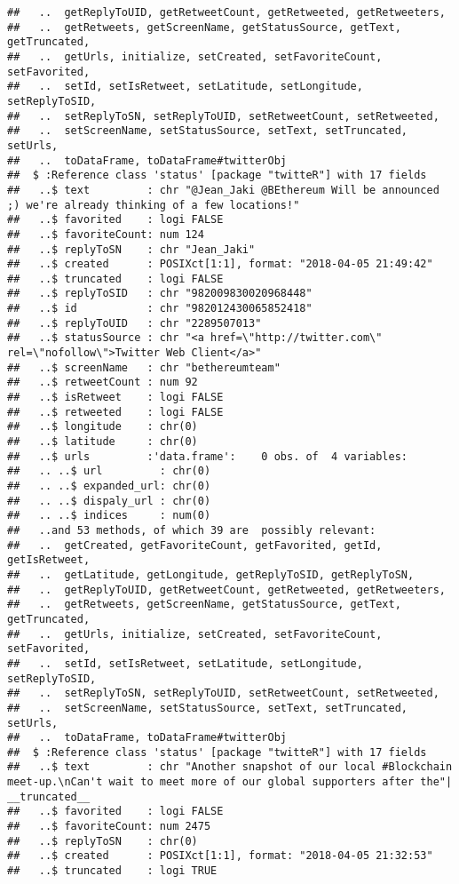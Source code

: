 \documentclass[]{article}
\begin{document}
\begin{verbatim}
##   ..  getReplyToUID, getRetweetCount, getRetweeted, getRetweeters,
##   ..  getRetweets, getScreenName, getStatusSource, getText, getTruncated,
##   ..  getUrls, initialize, setCreated, setFavoriteCount, setFavorited,
##   ..  setId, setIsRetweet, setLatitude, setLongitude, setReplyToSID,
##   ..  setReplyToSN, setReplyToUID, setRetweetCount, setRetweeted,
##   ..  setScreenName, setStatusSource, setText, setTruncated, setUrls,
##   ..  toDataFrame, toDataFrame#twitterObj
##  $ :Reference class 'status' [package "twitteR"] with 17 fields
##   ..$ text         : chr "@Jean_Jaki @BEthereum Will be announced ;) we're already thinking of a few locations!"
##   ..$ favorited    : logi FALSE
##   ..$ favoriteCount: num 124
##   ..$ replyToSN    : chr "Jean_Jaki"
##   ..$ created      : POSIXct[1:1], format: "2018-04-05 21:49:42"
##   ..$ truncated    : logi FALSE
##   ..$ replyToSID   : chr "982009830020968448"
##   ..$ id           : chr "982012430065852418"
##   ..$ replyToUID   : chr "2289507013"
##   ..$ statusSource : chr "<a href=\"http://twitter.com\" rel=\"nofollow\">Twitter Web Client</a>"
##   ..$ screenName   : chr "bethereumteam"
##   ..$ retweetCount : num 92
##   ..$ isRetweet    : logi FALSE
##   ..$ retweeted    : logi FALSE
##   ..$ longitude    : chr(0) 
##   ..$ latitude     : chr(0) 
##   ..$ urls         :'data.frame':    0 obs. of  4 variables:
##   .. ..$ url         : chr(0) 
##   .. ..$ expanded_url: chr(0) 
##   .. ..$ dispaly_url : chr(0) 
##   .. ..$ indices     : num(0) 
##   ..and 53 methods, of which 39 are  possibly relevant:
##   ..  getCreated, getFavoriteCount, getFavorited, getId, getIsRetweet,
##   ..  getLatitude, getLongitude, getReplyToSID, getReplyToSN,
##   ..  getReplyToUID, getRetweetCount, getRetweeted, getRetweeters,
##   ..  getRetweets, getScreenName, getStatusSource, getText, getTruncated,
##   ..  getUrls, initialize, setCreated, setFavoriteCount, setFavorited,
##   ..  setId, setIsRetweet, setLatitude, setLongitude, setReplyToSID,
##   ..  setReplyToSN, setReplyToUID, setRetweetCount, setRetweeted,
##   ..  setScreenName, setStatusSource, setText, setTruncated, setUrls,
##   ..  toDataFrame, toDataFrame#twitterObj
##  $ :Reference class 'status' [package "twitteR"] with 17 fields
##   ..$ text         : chr "Another snapshot of our local #Blockchain meet-up.\nCan't wait to meet more of our global supporters after the"| __truncated__
##   ..$ favorited    : logi FALSE
##   ..$ favoriteCount: num 2475
##   ..$ replyToSN    : chr(0) 
##   ..$ created      : POSIXct[1:1], format: "2018-04-05 21:32:53"
##   ..$ truncated    : logi TRUE

\end{verbatim}
\end{document}
